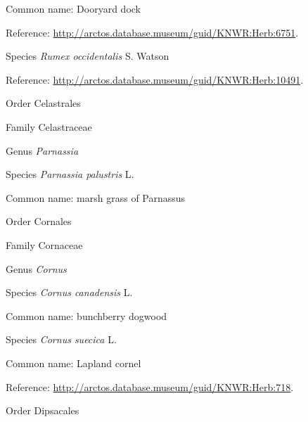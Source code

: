 \documentclass[9pt, article]{memoir}
\begin{document}
\begin{multicols}{2}
Common name: Dooryard dock

Reference: 
\url{http://arctos.database.museum/guid/KNWR:Herb:6751}.

\vspace{6pt}\noindent\hspace{36pt}Species \textit{Rumex occidentalis} S. Watson


Reference: 
\url{http://arctos.database.museum/guid/KNWR:Herb:10491}.

\vspace{6pt}\noindent\hspace{18pt}Order Celastrales


\vspace{6pt}\noindent\hspace{24pt}Family Celastraceae


\vspace{6pt}\noindent\hspace{30pt}Genus \textit{Parnassia}


\vspace{6pt}\noindent\hspace{36pt}Species \textit{Parnassia palustris} L.


Common name: marsh grass of Parnassus

\vspace{6pt}\noindent\hspace{18pt}Order Cornales


\vspace{6pt}\noindent\hspace{24pt}Family Cornaceae


\vspace{6pt}\noindent\hspace{30pt}Genus \textit{Cornus}


\vspace{6pt}\noindent\hspace{36pt}Species \textit{Cornus canadensis} L.


Common name: bunchberry dogwood

\vspace{6pt}\noindent\hspace{36pt}Species \textit{Cornus suecica} L.


Common name: Lapland cornel

Reference: 
\url{http://arctos.database.museum/guid/KNWR:Herb:718}.

\vspace{6pt}\noindent\hspace{18pt}Order Dipsacales



\end{multicols}
\end{document}
